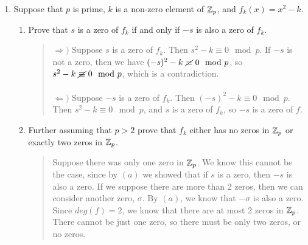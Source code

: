 \documentclass{hw}
\begin{document}
\begin{enumerate}
\item Suppose that $p$ is prime, $k$ is a non-zero element of $\mathbb{Z}_{p}$, and $f_{k}(x)=x^{2}-k$.
\begin{enumerate}
\item Prove that $s$ is a zero of $f_{k}$ if and only if $-s$ is also a zero of $f_{k}$.
\begin{quote}
$\Rightarrow)$ Suppose $s$ is a zero of $f_{k}$. Then $s^{2}-k\equiv0\mod p$. If $-s$ is not a zero,
then we have $(-s)^{2}-k\ \cancel{\equiv}\ 0\mod p$, so $s^{2}-k\ \cancel{\equiv}\ 0\mod p$, which
is a contradiction.\\\\
$\Leftarrow)$ Suppose $-s$ is a zero of $f_{k}$. Then $(-s)^{2}-k\equiv0\mod p$. Then
$s^{2}-k\equiv0\mod p$, and $s$ is a zero of $f_{k}$, so $-s$ is a zero of $f$.
\end{quote}
\item Further assuming that $p>2$ prove that $f_{k}$ either has no zeros in $\mathbb{Z}_{p}$ or exactly
two zeros in $\mathbb{Z}_{p}$.
\begin{quote}
Suppose there was only one zero in $\mathbb{Z}_{p}$. We know this cannot be the case, since by $(a)$ we
showed that if $s$ is a zero, then $-s$ is also a zero. If we suppose there are more than 2 zeros,
then we can consider another zero, $\sigma$. By $(a)$, we know that $-\sigma$ is also a zero. Since
$deg(f)=2$, we know that there are at most 2 zeros in $\mathbb{Z}_{p}$. There cannot be just one zero, so
there must be only two zeros, or no zeros.
\end{quote}
\end{enumerate}


\end{enumerate}
\end{document}
